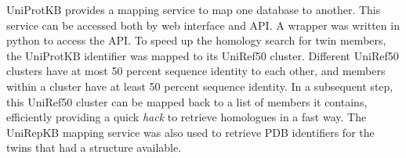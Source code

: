 UniProtKB provides a mapping service to map one database to another.
This service can be accessed both by web interface and API.
A wrapper was written in python to access the API.
To speed up the homology search for twin members,
the UniProtKB identifier was mapped to its UniRef50 cluster.
Different UniRef50 clusters have at most 50 percent sequence identity to each other, 
and members within a cluster have at least 50 percent sequence identity.
In a subsequent step, 
this UniRef50 cluster can be mapped back to a list of members it contains, 
efficiently providing a quick \textit{hack} to retrieve homologues in a fast way.
The UniRepKB mapping service was also used to retrieve PDB identifiers for the twins that had a structure available.
